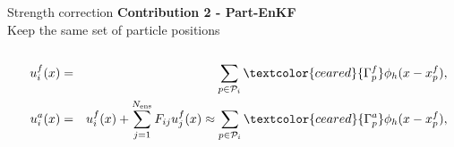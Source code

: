 \documentclass[aspectratio=169]{beamer} %
\begin{document}
\begin{frame}{Strength correction}
    \small
    \textbf{Contribution 2 - Part-EnKF} \\
    Keep the same set of particle positions \\
    \begin{columns}[t]
        \begin{column}{0.6\textwidth}
            \begin{eqnarray*}
                u_i^f(x) &=& \sum_{p \in \mathcal P_i} \textcolor{ceared}{\Gamma^f_p} \phi_h(x - x_p^f),\\
                \quad u^a_i(x) &=& u_i^f(x) + \sum_{j=1}^{N_{\text{ens}}} F_{ij} u_j^f(x) \approx \sum_{p \in \mathcal P_i} \textcolor{ceared}{\Gamma^a_p} \phi_h(x - x_p^f), \\
            \end{eqnarray*}
        \end{column}


\end{columns}
\end{frame}
\end{document}
